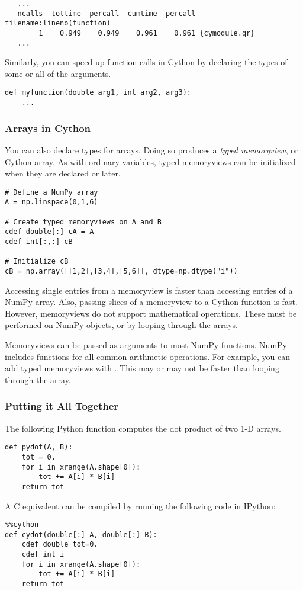 {\scriptsize
\begin{verbatim}
   ...
   ncalls  tottime  percall  cumtime  percall filename:lineno(function)
        1    0.949    0.949    0.961    0.961 {cymodule.qr}
   ...
       \end{verbatim}
       }
Similarly, you can speed up function calls in Cython by declaring the types of some or all of the arguments.
\begin{lstlisting}
def myfunction(double arg1, int arg2, arg3):
    ...
\end{lstlisting}

\subsubsection*{Arrays in Cython}
You can also declare types for arrays.
Doing so produces a \emph{typed memoryview}, or Cython array.
As with ordinary variables, typed memoryviews can be initialized when they are declared or later.
\begin{lstlisting}
# Define a NumPy array
A = np.linspace(0,1,6)

# Create typed memoryviews on A and B
cdef double[:] cA = A
cdef int[:,:] cB

# Initialize cB
cB = np.array([[1,2],[3,4],[5,6]], dtype=np.dtype("i"))
\end{lstlisting}

Accessing single entries from a memoryview is faster than accessing entries of a NumPy array.
Also, passing slices of a memoryview to a Cython function is fast.
However, memoryviews do not support mathematical operations.
These must be performed on NumPy objects, or by looping through the arrays.

\begin{info}
Memoryviews can be passed as arguments to most NumPy functions.
NumPy includes functions for all common arithmetic operations.
For example, you can add typed memoryviews with .
This may or may not be faster than looping through the array.
\end{info}

\subsubsection*{Putting it All Together}
The following Python function computes the dot product of two 1-D arrays.
\begin{lstlisting}
def pydot(A, B):
    tot = 0.
    for i in xrange(A.shape[0]):
        tot += A[i] * B[i]
    return tot
\end{lstlisting}
A C equivalent can be compiled by running the following code in IPython:
\begin{lstlisting}
%%cython
def cydot(double[:] A, double[:] B):
    cdef double tot=0.
    cdef int i
    for i in xrange(A.shape[0]):
        tot += A[i] * B[i]
    return tot
\end{lstlisting}

